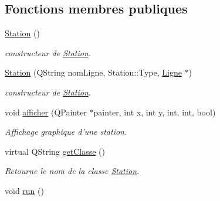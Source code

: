 \subsection*{Fonctions membres publiques}
\begin{DoxyCompactItemize}
\item 
\hypertarget{classStation_a73d335726aad1d844d81cda6d9fd74e6}{
\hyperlink{classStation_a73d335726aad1d844d81cda6d9fd74e6}{Station} ()}
\label{classStation_a73d335726aad1d844d81cda6d9fd74e6}

\begin{DoxyCompactList}\small\item\em constructeur de \hyperlink{classStation}{Station}. \item\end{DoxyCompactList}\item 
\hyperlink{classStation_a3f359a7bed774082d2f1b5927ce4dd5c}{Station} (QString nomLigne, Station::Type, \hyperlink{classLigne}{Ligne} $\ast$)
\begin{DoxyCompactList}\small\item\em constructeur de \hyperlink{classStation}{Station}. \item\end{DoxyCompactList}\item 
void \hyperlink{classStation_aa4918eec32fe4f3484f629564b84e160}{afficher} (QPainter $\ast$painter, int x, int y, int, int, bool)
\begin{DoxyCompactList}\small\item\em Affichage graphique d'une station. \item\end{DoxyCompactList}\item 
virtual QString \hyperlink{classStation_aea030824145267b81a453f5b56227cae}{getClasse} ()
\begin{DoxyCompactList}\small\item\em Retourne le nom de la classe \hyperlink{classStation}{Station}. \item\end{DoxyCompactList}\item 
\hypertarget{classStation_a73c0d1c00b8de39ff4eb16be708e9a92}{
void \hyperlink{classStation_a73c0d1c00b8de39ff4eb16be708e9a92}{run} ()}
\label{classStation_a73c0d1c00b8de39ff4eb16be708e9a92}


\end{DoxyCompactItemize}
